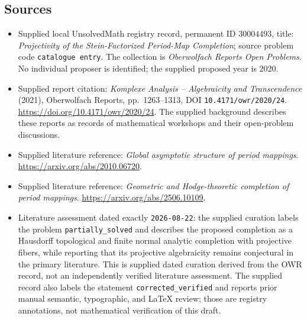 \documentclass[11pt]{article}
\begin{document}
\subsection{Sources}
\begin{itemize}
\item Supplied local UnsolvedMath registry record, permanent ID \(30004493\), title: \emph{Projectivity of the Stein-Factorized Period-Map Completion}; source problem code \texttt{catalogue entry}. The collection is \emph{Oberwolfach Reports Open Problems}. No individual proposer is identified; the supplied proposed year is 2020.
\item Supplied report citation: \emph{Komplexe Analysis -- Algebraicity and Transcendence} (2021), Oberwolfach Reports, pp.\ 1263--1313, DOI \texttt{10.4171/owr/2020/24}. \url{https://doi.org/10.4171/owr/2020/24}. The supplied background describes these reports as records of mathematical workshops and their open-problem discussions.
\item Supplied literature reference: \emph{Global asymptotic structure of period mappings}. \url{https://arxiv.org/abs/2010.06720}.
\item Supplied literature reference: \emph{Geometric and Hodge-theoretic completion of period mappings}. \url{https://arxiv.org/abs/2506.10109}.
\item Literature assessment dated exactly \texttt{2026-08-22}: the supplied curation labels the problem \texttt{partially\_solved} and describes the proposed completion as a Hausdorff topological and finite normal analytic completion with projective fibers, while reporting that its projective algebraicity remains conjectural in the primary literature. This is supplied dated curation derived from the OWR record, not an independently verified literature assessment. The supplied record also labels the statement \texttt{corrected\_verified} and reports prior manual semantic, typographic, and LaTeX review; those are registry annotations, not mathematical verification of this draft.
\end{itemize}
\end{document}
